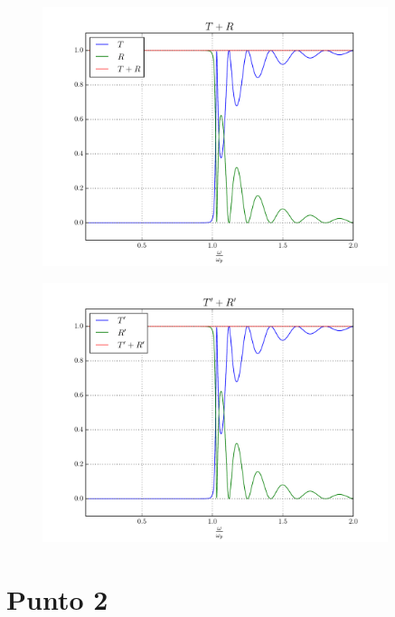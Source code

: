\documentclass[a4paper,11pt]{article}
\begin{document}
                            \begin{figure}[!ht]
                            \centering \includegraphics[width=0.9\textwidth]{Punto1BC/RT.pdf}
                            \end{figure}
                            
                            \begin{figure}[!ht]
                            \centering \includegraphics[width=0.9\textwidth]{Punto1BC/RTp.pdf}
                            \end{figure}



\section*{Punto 2}
\end{document}

